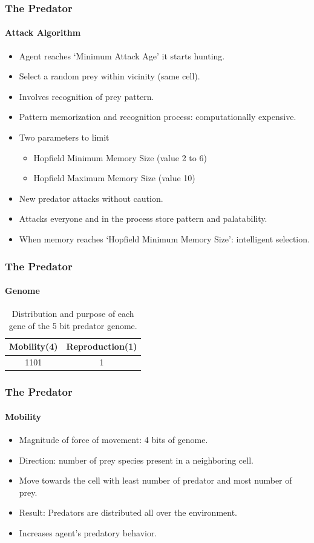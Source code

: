 \frame
{
	\frametitle{The Predator}
	\framesubtitle{Attack Algorithm}
	
	\begin{itemize}
		\item Agent reaches `Minimum Attack Age' it starts hunting.
		\item Select a random prey within vicinity (same cell).
		\item Involves recognition of prey pattern.
		\item Pattern memorization and recognition process: computationally expensive.
		\item Two parameters to limit 
			\begin{itemize}
				\item Hopfield Minimum Memory Size (value 2 to 6)
				\item Hopfield Maximum Memory Size (value 10)
			\end{itemize}
		\item New predator attacks without caution. 
		\item Attacks everyone and in the process store pattern and palatability.
		\item When memory reaches `Hopfield Minimum Memory Size': intelligent selection.
	\end{itemize}
}

\frame
{
	\frametitle{The Predator}
	\framesubtitle{Genome}

	\begin{table}
	\centering
	\begin{scriptsize}
	\begin{spacing}{1.5}
	\begin{tabular}{|c|c|}
		\hline
			\textbf{Mobility(4)} & \textbf{Reproduction(1)} \\ \hline
					 1101					   &					1						 		\\ \hline
	\end{tabular}
	\end{spacing}
	\end{scriptsize}
	\caption{Distribution and purpose of each gene of the 5 bit predator genome.}
	\label{tab:predator-genome}
	\end{table}
}

\frame
{
	\frametitle{The Predator}
	\framesubtitle{Mobility}
	
	\begin{itemize}
		\item Magnitude of force of movement: 4 bits of genome.
		\item Direction: number of prey species present in a neighboring cell.
		\item Move towards the cell with least number of predator and most number of prey.
		\item Result: Predators are distributed all over the environment.
		\item Increases agent's predatory behavior.
	\end{itemize}
}

